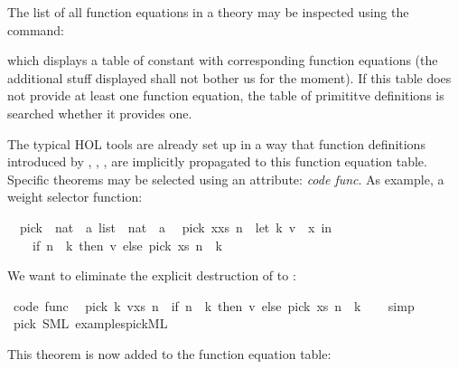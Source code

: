 \begin{isabellebody}
\isamarkuptrue%
%
\begin{isamarkuptext}%
The list of all function equations in a theory may be inspected
  using the \isasymPRINTCODETHMS command:%
\end{isamarkuptext}%
\isamarkuptrue%
\isamarkupfalse%
%
\begin{isamarkuptext}%
\noindent which displays a table of constant with corresponding
  function equations (the additional stuff displayed
  shall not bother us for the moment). If this table does
  not provide at least one function
  equation, the table of primititve definitions is searched
  whether it provides one.

  The typical HOL tools are already set up in a way that
  function definitions introduced by \isasymFUN, \isasymFUNCTION,
  \isasymPRIMREC, \isasymRECDEF are implicitly propagated
  to this function equation table. Specific theorems may be
  selected using an attribute: \emph{code func}. As example,
  a weight selector function:%
\end{isamarkuptext}%
\isamarkuptrue%
\isamarkupfalse%
\isanewline
\ \ pick\ {\isacharcolon}{\isacharcolon}\ {\isachardoublequoteopen}{\isacharparenleft}nat\ {\isasymtimes}\ {\isacharprime}a{\isacharparenright}\ list\ {\isasymRightarrow}\ nat\ {\isasymRightarrow}\ {\isacharprime}a{\isachardoublequoteclose}\isanewline
\isanewline
{}\isamarkupfalse%
\isanewline
\ \ {\isachardoublequoteopen}pick\ {\isacharparenleft}x{\isacharhash}xs{\isacharparenright}\ n\ {\isacharequal}\ {\isacharparenleft}let\ {\isacharparenleft}k{\isacharcomma}\ v{\isacharparenright}\ {\isacharequal}\ x\ in\isanewline
\ \ \ \ if\ n\ {\isacharless}\ k\ then\ v\ else\ pick\ xs\ {\isacharparenleft}n\ {\isacharminus}\ k{\isacharparenright}{\isacharparenright}{\isachardoublequoteclose}%
\begin{isamarkuptext}%
We want to eliminate the explicit destruction
  of  to :%
\end{isamarkuptext}%
\isamarkuptrue%
\isamarkupfalse%
\ {\isacharbrackleft}code\ func{\isacharbrackright}{\isacharcolon}\isanewline
\ \ {\isachardoublequoteopen}pick\ {\isacharparenleft}{\isacharparenleft}k{\isacharcomma}\ v{\isacharparenright}{\isacharhash}xs{\isacharparenright}\ n\ {\isacharequal}\ {\isacharparenleft}if\ n\ {\isacharless}\ k\ then\ v\ else\ pick\ xs\ {\isacharparenleft}n\ {\isacharminus}\ k{\isacharparenright}{\isacharparenright}{\isachardoublequoteclose}\isanewline
%
\isadelimproof
\ \ %
\endisadelimproof
%
\isatagproof
{}\isamarkupfalse%
\ simp%
\endisatagproof
{\isafoldproof}%
%
\isadelimproof
\isanewline
%
\endisadelimproof
\isanewline
{}\isamarkupfalse%
\ pick\ {\isacharparenleft}SML\ {\isachardoublequoteopen}examples{\isacharslash}pick{}{\isachardot}ML{\isachardoublequoteclose}{\isacharparenright}%
\begin{isamarkuptext}%
This theorem is now added to the function equation table:


\end{isamarkuptext}
\end{isabellebody}
